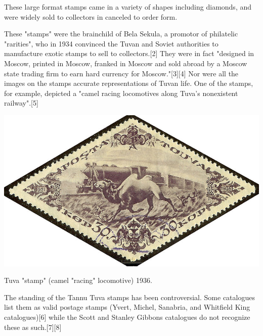 These large format stamps came in a variety of shapes including diamonds, and were widely sold to collectors in canceled to order form.


These "stamps" were the brainchild of Bela Sekula, a promotor of philatelic "rarities", who in 1934 convinced the Tuvan and Soviet authorities to manufacture exotic stamps to sell to collectors.[2] They were in fact "designed in Moscow, printed in Moscow, franked in Moscow and sold abroad by a Moscow state trading firm to earn hard currency for Moscow."[3][4] Nor were all the images on the stamps accurate representations of Tuvan life. One of the stamps, for example, depicted a "camel racing locomotives along Tuva's nonexistent railway".[5]

\begin{marginfigure}
\includegraphics[width=0.95\linewidth]{../tannu-tuva/tuva-camel.jpg}
\caption{
Tuva "stamp" (camel "racing" locomotive) 1936.
}
\end{marginfigure}


The standing of the Tannu Tuva stamps has been controversial. Some catalogues list them as valid postage stamps (Yvert, Michel, Sanabria, and Whitfield King catalogues)[6] while the Scott and Stanley Gibbons catalogues do not recognize these as such.[7][8] 

